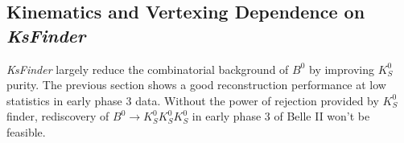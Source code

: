 \subsection{Kinematics and Vertexing Dependence on \textit{KsFinder}} 

\textit{KsFinder} largely reduce the combinatorial background of $B^0$ by improving $K_S^0$ purity. The previous section shows a good reconstruction performance at low statistics in early phase 3 data. Without the power of rejection provided by $K_S^0$ finder, rediscovery of $B^0 \to K_S^0  K_S^0  K_S^0$ in early phase 3 of Belle II won't be feasible. 

